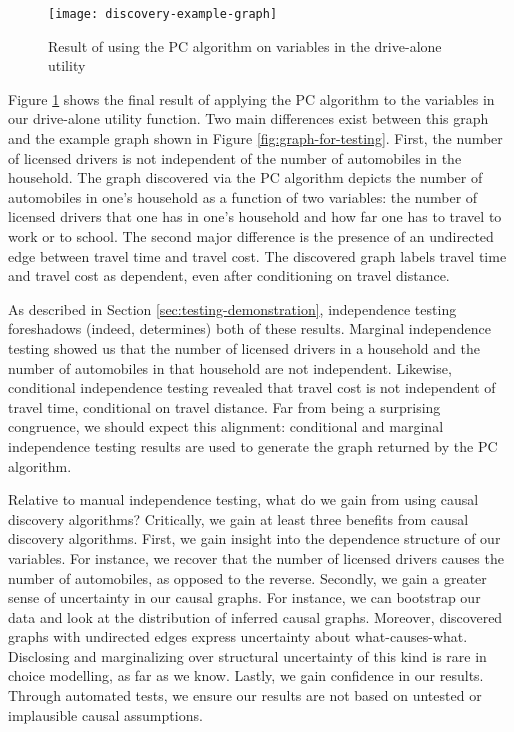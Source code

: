 \begin{figure}
   \centering
   \texttt{[image: discovery-example-graph]}
   \caption{Result of using the PC algorithm on variables in the drive-alone utility}
   \label{fig:discovery-example-graph}
\end{figure}

Figure \ref{fig:discovery-example-graph} shows the final result of applying the PC algorithm to the variables in our drive-alone utility function.
Two main differences exist between this graph and the example graph shown in Figure \ref{fig:graph-for-testing}.
First, the number of licensed drivers is not independent of the number of automobiles in the household.
The graph discovered via the PC algorithm depicts the number of automobiles in one's household as a function of two variables: the number of licensed drivers that one has in one's household and how far one has to travel to work or to school.
The second major difference is the presence of an undirected edge between travel time and travel cost.
The discovered graph labels travel time and travel cost as dependent, even after conditioning on travel distance.

As described in Section \ref{sec:testing-demonstration}, independence testing foreshadows (indeed, determines) both of these results.
Marginal independence testing showed us that the number of licensed drivers in a household and the number of automobiles in that household are not independent.
Likewise, conditional independence testing revealed that travel cost is not independent of travel time, conditional on travel distance.
Far from being a surprising congruence, we should expect this alignment: conditional and marginal independence testing results are used to generate the graph returned by the PC algorithm.

Relative to manual independence testing, what do we gain from using causal discovery algorithms?
Critically, we gain at least three benefits from causal discovery algorithms.
First, we gain insight into the dependence structure of our variables.
For instance, we recover that the number of licensed drivers causes the number of automobiles, as opposed to the reverse.
Secondly, we gain a greater sense of uncertainty in our causal graphs.
For instance, we can bootstrap our data and look at the distribution of inferred causal graphs.
Moreover, discovered graphs with undirected edges express uncertainty about what-causes-what.
Disclosing and marginalizing over structural uncertainty of this kind is rare in choice modelling, as far as we know.
Lastly, we gain confidence in our results.
Through automated tests, we ensure our results are not based on untested or implausible causal assumptions.
